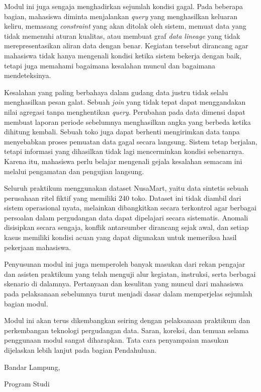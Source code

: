 Modul ini juga sengaja menghadirkan sejumlah kondisi gagal. Pada beberapa bagian, mahasiswa diminta menjalankan \emph{query} yang menghasilkan keluaran keliru, memasang \emph{constraint} yang akan ditolak oleh sistem, memuat data yang tidak memenuhi aturan kualitas, atau membuat graf \emph{data lineage} yang tidak merepresentasikan aliran data dengan benar. Kegiatan tersebut dirancang agar mahasiswa tidak hanya mengenali kondisi ketika sistem bekerja dengan baik, tetapi juga memahami bagaimana kesalahan muncul dan bagaimana mendeteksinya.

Kesalahan yang paling berbahaya dalam gudang data justru tidak selalu menghasilkan pesan galat. Sebuah \emph{join} yang tidak tepat dapat menggandakan nilai agregasi tanpa menghentikan \emph{query}. Perubahan pada data dimensi dapat membuat laporan periode sebelumnya menghasilkan angka yang berbeda ketika dihitung kembali. Sebuah toko juga dapat berhenti mengirimkan data tanpa menyebabkan proses pemuatan data gagal secara langsung. Sistem tetap berjalan, tetapi informasi yang dihasilkan tidak lagi mencerminkan kondisi sebenarnya. Karena itu, mahasiswa perlu belajar mengenali gejala kesalahan semacam ini melalui pengamatan dan pengujian langsung.

Seluruh praktikum menggunakan dataset NusaMart, yaitu data sintetis sebuah perusahaan ritel fiktif yang memiliki 240 toko. Dataset ini tidak diambil dari sistem operasional nyata, melainkan dibangkitkan secara terkontrol agar berbagai persoalan dalam pergudangan data dapat dipelajari secara sistematis. Anomali disisipkan secara sengaja, konflik antarsumber dirancang sejak awal, dan setiap kasus memiliki kondisi acuan yang dapat digunakan untuk memeriksa hasil pekerjaan mahasiswa.

Penyusunan modul ini juga memperoleh banyak masukan dari rekan pengajar dan asisten praktikum yang telah menguji alur kegiatan, instruksi, serta berbagai skenario di dalamnya. Pertanyaan dan kesulitan yang muncul dari mahasiswa pada pelaksanaan sebelumnya turut menjadi dasar dalam memperjelas sejumlah bagian modul.

Modul ini akan terus dikembangkan seiring dengan pelaksanaan praktikum dan perkembangan teknologi pergudangan data. Saran, koreksi, dan temuan selama penggunaan modul sangat diharapkan. Tata cara penyampaian masukan dijelaskan lebih lanjut pada bagian Pendahuluan.


\vspace{1.2cm}

\noindent
\begin{minipage}{\linewidth}
\raggedleft
Bandar Lampung, \doctanggal\par
\vspace{0.35em}
\textbf{\penyusun}\par
{\color{Slate}Program Studi \programname\par}
\end{minipage}

\clearpage
